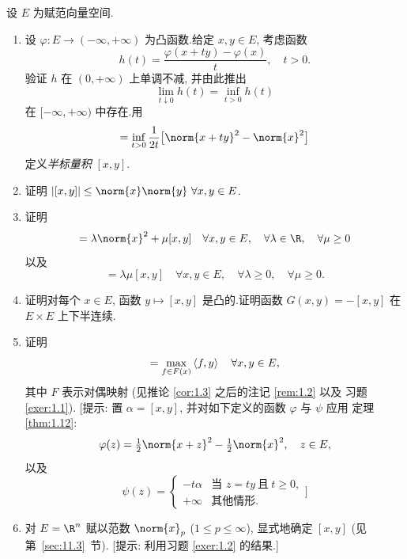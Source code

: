 \begin{exercise}[半标量积.]
\label{exer:1.25}
设 $E$ 为赋范向量空间.

\begin{enumerate}[label=\arabic*., leftmargin=2.2em, itemsep=0.25em]
	\item 设 $\varphi:E\to(-\infty,+\infty)$ 为凸函数.给定 $x,y\in E$, 考虑函数
	      \begin{equation*}
	      h(t)=\frac{\varphi(x+ty)-\varphi(x)}{t},\quad t>0.
	      \end{equation*}
	      验证 $h$ 在 $(0,+\infty)$ 上单调不减, 并由此推出
	      \begin{equation*}
	      \lim_{t\downarrow0}h(t)=\inf_{t>0}h(t)
	      \end{equation*}
	      在 $[-\infty,+\infty)$ 中存在.用
	      \begin{equation*}
	      [x,y]=\inf_{t>0}\frac{1}{2t}\bigl[\norm{x+ty}^2-\norm{x}^2\bigr]
	      \end{equation*}
	      定义\emph{半标量积} $[x,y]$.
	\item 证明 $\abs{[x,y]}\le\norm{x}\norm{y}\ \forall x,y\in E$.
	\item 证明
	      \begin{equation*}
	      [x,\lambda x+\mu y]=\lambda\norm{x}^2+\mu[x,y]
	      \quad \forall x,y\in E,\quad \forall\lambda\in\R,\quad \forall\mu\ge0
	      \end{equation*}
	      以及
	      \begin{equation*}
	      [\lambda x,\mu y]=\lambda\mu[x,y]
	      \quad \forall x,y\in E,\quad \forall\lambda\ge0,\quad \forall\mu\ge0.
	      \end{equation*}
	\item 证明对每个 $x\in E$, 函数 $y\mapsto[x,y]$ 是凸的.证明函数
	      $G(x,y)=-[x,y]$ 在 $E\times E$ 上下半连续.
	\item 证明
	      \begin{equation*}
	      [x,y]=\max_{f\in F(x)}\dual{f}{y}\quad \forall x,y\in E,
	      \end{equation*}
	      其中 $F$ 表示对偶映射 (见推论  \ref{cor:1.3} 之后的注记 \ref{rem:1.2} 以及
	      习题  \ref{exer:1.1}).
	      [提示: 置 $\alpha=[x,y]$, 并对如下定义的函数 $\varphi$ 与 $\psi$ 应用
	      定理  \ref{thm:1.12}:
	      \begin{equation*}
	      \varphi(z)=\tfrac12\norm{x+z}^2-\tfrac12\norm{x}^2,\quad z\in E,
	      \end{equation*}
	      以及
	      \begin{equation*}
	      \psi(z)=\begin{cases}-t\alpha & \text{当 } z=ty\ \text{且}\ t\ge0,\\
	      +\infty & \text{其他情形}.\end{cases}]
	      \end{equation*}
	\item 对 $E=\R^n$ 赋以范数 $\norm{x}_p$ ($1\le p\le\infty$), 显式地确定 $[x,y]$
	      (见第~\ref{sec:11.3}~节).
	      [提示: 利用习题  \ref{exer:1.2} 的结果.]
\end{enumerate}
\end{exercise}

